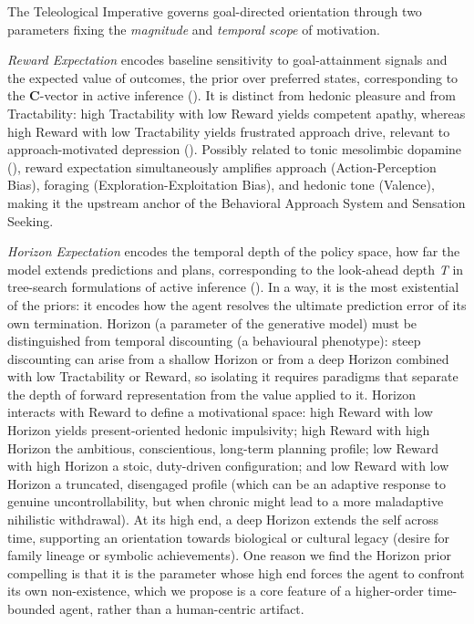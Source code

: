 \documentclass[
  jou,
  floatsintext,
  longtable,
  nolmodern,
  notxfonts,
  notimes,
  12pt,
  colorlinks=true,linkcolor=blue,citecolor=blue,urlcolor=blue]{apa7}
\begin{document}
The Teleological Imperative governs goal-directed orientation through
two parameters fixing the \emph{magnitude} and \emph{temporal scope} of
motivation.

\emph{Reward Expectation} encodes baseline sensitivity to
goal-attainment signals and the expected value of outcomes, the prior
over preferred states, corresponding to the \textbf{C}-vector in active
inference ().
It is distinct from hedonic pleasure and from Tractability: high
Tractability with low Reward yields competent apathy, whereas high
Reward with low Tractability yields frustrated approach drive, relevant
to approach-motivated depression (). Possibly related to tonic mesolimbic dopamine
(), reward
expectation simultaneously amplifies approach (Action-Perception Bias),
foraging (Exploration-Exploitation Bias), and hedonic tone (Valence),
making it the upstream anchor of the Behavioral Approach System and
Sensation Seeking.

\emph{Horizon Expectation} encodes the temporal depth of the policy
space, how far the model extends predictions and plans, corresponding to
the look-ahead depth \emph{T} in tree-search formulations of active
inference (). In a way, it is the most existential of the priors: it encodes
how the agent resolves the ultimate prediction error of its own
termination. Horizon (a parameter of the generative model) must be
distinguished from temporal discounting (a behavioural phenotype): steep
discounting can arise from a shallow Horizon or from a deep Horizon
combined with low Tractability or Reward, so isolating it requires
paradigms that separate the depth of forward representation from the
value applied to it. Horizon interacts with Reward to define a
motivational space: high Reward with low Horizon yields present-oriented
hedonic impulsivity; high Reward with high Horizon the ambitious,
conscientious, long-term planning profile; low Reward with high Horizon
a stoic, duty-driven configuration; and low Reward with low Horizon a
truncated, disengaged profile (which can be an adaptive response to
genuine uncontrollability, but when chronic might lead to a more
maladaptive nihilistic withdrawal). At its high end, a deep Horizon
extends the self across time, supporting an orientation towards
biological or cultural legacy (desire for family lineage or symbolic
achievements). One reason we find the Horizon prior compelling is that
it is the parameter whose high end forces the agent to confront its own
non-existence, which we propose is a core feature of a higher-order
time-bounded agent, rather than a human-centric artifact.
\end{document}
